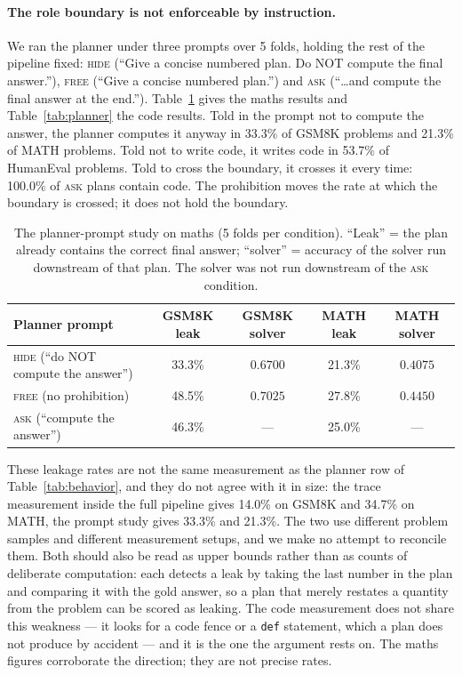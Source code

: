 \documentclass[11pt,a4paper]{article}
\begin{document}
\paragraph{The role boundary is not enforceable by instruction.} We ran the planner under three prompts over 5 folds, holding the rest of the pipeline fixed: \textsc{hide} (``Give a concise numbered plan. Do NOT compute the final answer.''), \textsc{free} (``Give a concise numbered plan.'') and \textsc{ask} (``\dots and compute the final answer at the end.''). Table~\ref{tab:planmath} gives the maths results and Table~\ref{tab:planner} the code results. Told in the prompt not to compute the answer, the planner computes it anyway in 33.3\% of GSM8K problems and 21.3\% of MATH problems. Told not to write code, it writes code in 53.7\% of HumanEval problems. Told to cross the boundary, it crosses it every time: 100.0\% of \textsc{ask} plans contain code. The prohibition moves the rate at which the boundary is crossed; it does not hold the boundary.

\begin{table}[h]\centering\small
\begin{tabular}{@{}l c c c c@{}}
\toprule
Planner prompt & GSM8K leak & GSM8K solver & MATH leak & MATH solver\\
\midrule
\textsc{hide} (``do NOT compute the answer'') & 33.3\% & $0.6700$ & 21.3\% & $0.4075$\\
\textsc{free} (no prohibition) & 48.5\% & $0.7025$ & 27.8\% & $0.4450$\\
\textsc{ask} (``compute the answer'') & 46.3\% & --- & 25.0\% & ---\\
\bottomrule
\end{tabular}
\caption{The planner-prompt study on maths (5 folds per condition). ``Leak'' = the plan already
contains the correct final answer; ``solver'' = accuracy of the solver run downstream of that plan.
The solver was not run downstream of the \textsc{ask} condition.}
\label{tab:planmath}
\end{table}

These leakage rates are not the same measurement as the planner row of Table~\ref{tab:behavior}, and they do not agree with it in size: the trace measurement inside the full pipeline gives 14.0\% on GSM8K and 34.7\% on MATH, the prompt study gives 33.3\% and 21.3\%. The two use different problem samples and different measurement setups, and we make no attempt to reconcile them. Both should also be read as upper bounds rather than as counts of deliberate computation: each detects a leak by taking the last number in the plan and comparing it with the gold answer, so a plan that merely restates a quantity from the problem can be scored as leaking. The code measurement does not share this weakness --- it looks for a code fence or a \texttt{def} statement, which a plan does not produce by accident --- and it is the one the argument rests on. The maths figures corroborate the direction; they are not precise rates.
\end{document}
